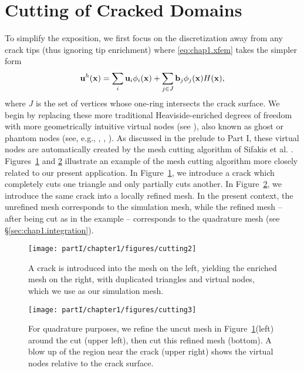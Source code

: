 \section{Cutting of Cracked Domains} \label{sec:chap1.cutting}

To simplify the exposition, we first focus on the discretization away from any crack tips (thus ignoring tip enrichment) where \eqref{eq:chap1.xfem} takes the simpler form
\begin{equation*}
\mathbf{u}^h(\mathbf{x}) = \sum_i \mathbf{u}_i \phi_i(\mathbf{x}) + \sum_{j \in J} \mathbf{b}_j \phi_j(\mathbf{x}) H(\mathbf{x}),
\end{equation*}
where $J$ is the set of vertices whose one-ring intersects the crack surface. We begin by replacing these more traditional Heaviside-enriched degrees of freedom with more geometrically intuitive virtual nodes (see \cite{Molino05}), also known as ghost or phantom nodes (see, e.g., \cite{Song06}, \cite{Hansbo04}, \cite{Dolbow09}). As discussed in the prelude to Part I, these virtual nodes are automatically created by the mesh cutting algorithm of Sifakis et al. \cite{Sifakis07}. Figures~\ref{fig:chap1.cutting.unrefined} and \ref{fig:chap1.cutting.refined} illustrate an example of the mesh cutting algorithm more closely related to our present application. In Figure~\ref{fig:chap1.cutting.unrefined}, we introduce a crack which completely cuts one triangle and only partially cuts another. In Figure~\ref{fig:chap1.cutting.refined}, we introduce the same crack into a locally refined mesh. In the present context, the unrefined mesh corresponds to the simulation mesh, while the refined mesh -- after being cut as in the example -- corresponds to the quadrature mesh (see \S\ref{sec:chap1.integration}).

\setlength{\figurewidth}{\textwidth}
\begin{figure}[htbp]
\centering
\texttt{[image: partI/chapter1/figures/cutting2]}
\caption{A crack is introduced into the mesh on the left, yielding the enriched mesh on the right, with duplicated triangles and virtual nodes, which we use as our simulation mesh.}
\label{fig:chap1.cutting.unrefined}
\end{figure}

\setlength{\figurewidth}{\textwidth}
\begin{figure}[htbp]
\centering
\texttt{[image: partI/chapter1/figures/cutting3]}
\caption{For quadrature purposes, we refine the uncut mesh in Figure~\ref{fig:chap1.cutting.unrefined}(left) around the cut (upper left), then cut this refined mesh (bottom). A blow up of the region near the crack (upper right) shows the virtual nodes relative to the crack surface.}
\label{fig:chap1.cutting.refined}
\end{figure}

